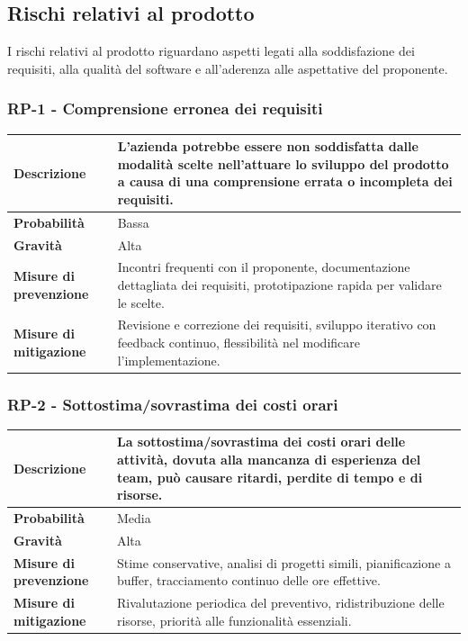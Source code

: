 \documentclass[11pt,a4paper]{article}
\begin{document}
\subsection{Rischi relativi al prodotto}
I rischi relativi al prodotto riguardano aspetti legati alla soddisfazione dei requisiti, alla qualità del software e all'aderenza alle aspettative del proponente.

\subsubsection{RP-1 - Comprensione erronea dei requisiti}
\begin{center}
\begin{tabular}{|p{3cm}|p{12cm}|}
    \hline
    \textbf{Descrizione} & L'azienda potrebbe essere non soddisfatta dalle modalità scelte nell'attuare lo sviluppo del prodotto a causa di una comprensione errata o incompleta dei requisiti. \\
    \hline
    \textbf{Probabilità} & Bassa \\
    \hline
    \textbf{Gravità} & Alta \\
    \hline
    \textbf{Misure di prevenzione} & Incontri frequenti con il proponente, documentazione dettagliata dei requisiti, prototipazione rapida per validare le scelte. \\
    \hline
    \textbf{Misure di mitigazione} & Revisione e correzione dei requisiti, sviluppo iterativo con feedback continuo, flessibilità nel modificare l'implementazione. \\
    \hline
\end{tabular}
\end{center}

\subsubsection{RP-2 - Sottostima/sovrastima dei costi orari}
\begin{center}
\begin{tabular}{|p{3cm}|p{12cm}|}
    \hline
    \textbf{Descrizione} & La sottostima/sovrastima dei costi orari delle attività, dovuta alla mancanza di esperienza del team, può causare ritardi, perdite di tempo e di risorse. \\
    \hline
    \textbf{Probabilità} & Media \\
    \hline
    \textbf{Gravità} & Alta \\
    \hline
    \textbf{Misure di prevenzione} & Stime conservative, analisi di progetti simili, pianificazione a buffer, tracciamento continuo delle ore effettive. \\
    \hline
    \textbf{Misure di mitigazione} & Rivalutazione periodica del preventivo, ridistribuzione delle risorse, priorità alle funzionalità essenziali. \\
    \hline
\end{tabular}
\end{center}
\end{document}
